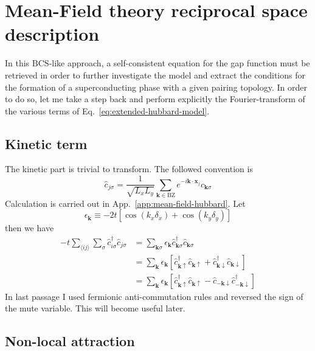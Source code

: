 \section{Mean-Field theory reciprocal space description}\label{sec:mft-analysis-reciprocal-space}

In this $\mathrm{BCS}$-like approach, a self-consistent equation for the gap function must be retrieved in order to further investigate the model and extract the conditions for the formation of a superconducting phase with a given pairing topology. In order to do so, let me take a step back and perform explicitly the Fourier-transform of the various terms of Eq.~\ref{eq:extended-hubbard-model}.

\subsection{Kinetic term}

The kinetic part is trivial to transform. The followed convention is
\[
	\hat c_{j\sigma} = \frac{1}{\sqrt{L_xL_y}} \sum_{\mathbf{k} \in \mathrm{BZ}} e^{-i \mathbf{k} \cdot \mathbf{x}_j} \hat c_{\mathbf{k}\sigma}
\]
Calculation is carried out in App.~\ref{app:mean-field-hubbard}. Let
\[
	\epsilon_\mathbf{k} \equiv -2t \left[
	\cos(k_x \delta_x) + \cos(k_y \delta_y)
	\right]
\]
then we have
\[
\begin{aligned}
	-t \sum_{\langle ij \rangle} \sum_\sigma \hat c_{i\sigma}^\dagger \hat c_{j\sigma} &= \sum_{\mathbf{k}\sigma} \epsilon_\mathbf{k} \hat c_{\mathbf{k}\sigma}^\dagger \hat c_{\mathbf{k}\sigma} \\
	&= \sum_\mathbf{k} \epsilon_\mathbf{k} \left[
	\hat c_{\mathbf{k}\uparrow}^\dagger \hat c_{\mathbf{k}\uparrow} + \hat c_{\mathbf{k}\downarrow}^\dagger \hat c_{\mathbf{k}\downarrow}
	\right] \\
	&= \sum_\mathbf{k} \epsilon_\mathbf{k} \left[
	\hat c_{\mathbf{k}\uparrow}^\dagger \hat c_{\mathbf{k}\uparrow}- \hat c_{-\mathbf{k}\downarrow} \hat c_{-\mathbf{k}\downarrow}^\dagger 
	\right]
\end{aligned}
\]
In last passage I used fermionic anti-commutation rules and reversed the sign of the mute variable. This will become useful later.

\subsection{Non-local attraction}

